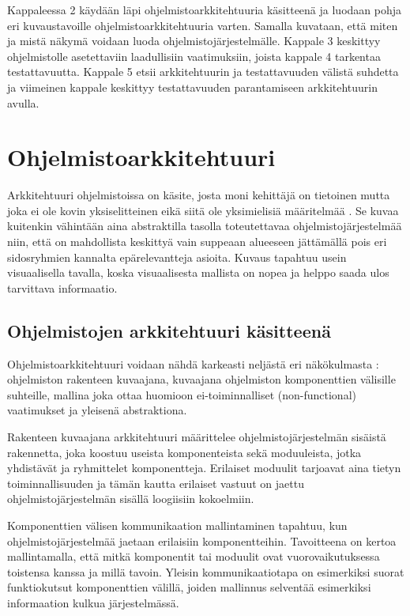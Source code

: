 \documentclass[finnish]{tktltiki2}
\theoremstyle{definition}
\theoremstyle{remark}
\begin{document}
Kappaleessa 2 käydään läpi ohjelmistoarkkitehtuuria käsitteenä ja luodaan pohja eri kuvaustavoille ohjelmistoarkkitehtuuria varten. Samalla kuvataan, että miten ja mistä näkymä voidaan luoda ohjelmistojärjestelmälle. Kappale 3 keskittyy ohjelmistolle asetettaviin laadullisiin vaatimuksiin, joista kappale 4 tarkentaa testattavuutta. Kappale 5 etsii arkkitehtuurin ja testattavuuden välistä suhdetta ja viimeinen kappale keskittyy testattavuuden parantamiseen arkkitehtuurin avulla.


\section{Ohjelmistoarkkitehtuuri}
Arkkitehtuuri ohjelmistoissa on käsite, josta moni kehittäjä on tietoinen mutta joka ei ole kovin yksiselitteinen eikä siitä ole yksimielisiä määritelmää \citep[s. 363]{solms_what_2012}. 
Se kuvaa kuitenkin vähintään aina abstraktilla tasolla toteutettavaa ohjelmistojärjestelmää niin, että on mahdollista keskittyä vain suppeaan alueeseen jättämällä pois eri sidosryhmien kannalta epärelevantteja asioita. Kuvaus tapahtuu usein visuaalisella tavalla, koska visuaalisesta mallista on nopea ja helppo saada ulos tarvittava informaatio.   

\subsection{Ohjelmistojen arkkitehtuuri käsitteenä}
Ohjelmistoarkkitehtuuri voidaan nähdä karkeasti neljästä eri näkökulmasta  \citep[s. 2-7]{gorton_understanding_2011}:  ohjelmiston rakenteen kuvaajana, kuvaajana ohjelmiston komponenttien välisille suhteille, mallina joka ottaa huomioon ei-toiminnalliset (non-functional) vaatimukset ja yleisenä abstraktiona. 

Rakenteen kuvaajana arkkitehtuuri määrittelee ohjelmistojärjestelmän sisäistä rakennetta, joka koostuu useista komponenteista sekä moduuleista, jotka yhdistävät ja ryhmittelet komponentteja. Erilaiset moduulit tarjoavat aina tietyn toiminnallisuuden ja tämän kautta erilaiset vastuut on jaettu ohjelmistojärjestelmän sisällä loogiisiin kokoelmiin.

Komponenttien välisen kommunikaation mallintaminen tapahtuu, kun ohjelmistojärjestelmää jaetaan erilaisiin komponentteihin. Tavoitteena on kertoa mallintamalla, että mitkä komponentit tai moduulit ovat vuorovaikutuksessa toistensa kanssa ja millä tavoin. Yleisin kommunikaatiotapa on esimerkiksi suorat funktiokutsut komponenttien välillä, joiden mallinnus selventää esimerkiksi informaation kulkua järjestelmässä.  
\end{document}
